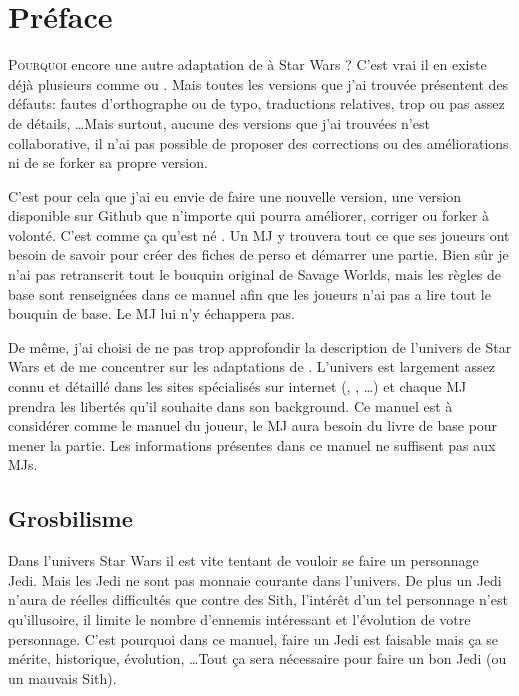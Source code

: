 \onecolumn
\section{Préface}

\lettrine{P}{ourquoi} encore une autre adaptation de  à {\jedifont Star Wars} ? C’est vrai il en existe déjà plusieurs comme  ou . Mais toutes les versions que j’ai trouvée présentent des défauts: fautes d’orthographe ou de typo, traductions relatives, trop ou pas assez de détails, \ldots Mais surtout, aucune des versions que j’ai trouvées n’est collaborative, il n’ai pas possible de proposer des corrections ou des améliorations ni de se forker sa propre version.

C’est pour cela que j’ai eu envie de faire une nouvelle version, une version disponible sur Github que n’importe qui pourra améliorer, corriger ou forker à volonté. C’est comme ça qu’est né {\jedifont \doctitle}. Un MJ y trouvera tout ce que ses joueurs ont besoin de savoir pour créer des fiches de perso et démarrer une partie. Bien sûr je n’ai pas retranscrit tout le bouquin original de Savage Worlds, mais les règles de base sont renseignées dans ce manuel afin que les joueurs n’ai pas a lire tout le bouquin de base. Le MJ lui n’y échappera pas.

De même, j’ai choisi de ne pas trop approfondir la description de l’univers de Star Wars et de me concentrer sur les adaptations de . L’univers est largement assez connu et détaillé dans les sites spécialisés sur internet (, , \ldots) et chaque MJ prendra les libertés qu’il souhaite dans son background. Ce manuel est à considérer comme le manuel du joueur, le MJ aura besoin du livre de base  pour mener la partie. Les informations présentes dans ce manuel ne suffisent pas aux MJs.

\subsection{Grosbilisme}
Dans l’univers Star Wars il est vite tentant de vouloir se faire un personnage Jedi. Mais les Jedi ne sont pas monnaie courante dans l’univers. De plus un Jedi n’aura de réelles difficultés que contre des Sith, l’intérêt d’un tel personnage n’est qu’illusoire, il limite le nombre d’ennemis intéressant et l’évolution de votre personnage. C’est pourquoi dans ce manuel, faire un Jedi est faisable mais ça se mérite, historique, évolution, \ldots Tout ça sera nécessaire pour faire un bon Jedi (ou un mauvais Sith).

